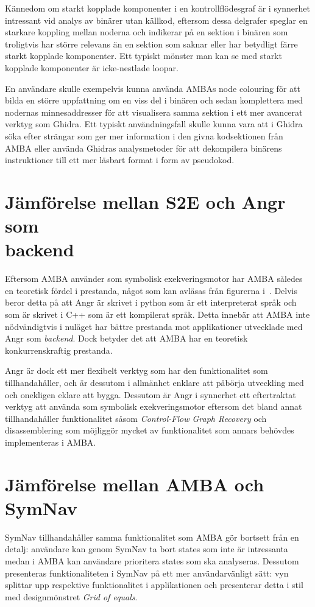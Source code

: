 Kännedom om starkt kopplade komponenter i en kontrollflödesgraf är i synnerhet
intressant vid analys av binärer utan källkod, eftersom dessa delgrafer speglar
en starkare koppling mellan noderna och indikerar på en sektion i binären som
troligtvis har större relevans än en sektion som saknar eller har betydligt
färre starkt kopplade komponenter. Ett typiskt mönster man kan se med starkt
kopplade komponenter är icke-nestlade loopar.

En användare skulle exempelvis kunna använda AMBAs node colouring för att bilda
en större uppfattning om en viss del i binären och sedan komplettera med
nodernas minnesaddresser för att visualisera samma sektion i ett mer avancerat
verktyg som Ghidra. Ett typiskt användningsfall skulle kunna vara att i Ghidra
söka efter strängar som ger mer information i den givna kodsektionen från AMBA
eller använda Ghidras analysmetoder för att dekompilera binärens instruktioner
till ett mer läsbart format i form av pseudokod.

\section{Jämförelse mellan S2E och Angr som \\ backend} Eftersom AMBA använder
\stoe{} som symbolisk exekveringsmotor har AMBA således en teoretisk fördel i
prestanda, något som kan avläsas från figurerna
i~\cite[Figur~1-5]{systematic_comparison_symbex}. Delvis beror detta på att Angr
är skrivet i python som är ett interpreterat språk och \stoe{} som är skrivet i
C++ som är ett kompilerat språk. Detta innebär att AMBA inte nödvändigtvis i
nuläget har bättre prestanda mot applikationer utvecklade med Angr som
\emph{backend}. Dock betyder det att AMBA har en teoretisk konkurrenskraftig
prestanda.

Angr är dock ett mer flexibelt verktyg som har den funktionalitet som \stoe{}
tillhandahåller, och är dessutom i allmänhet enklare att påbörja utveckling med
och onekligen eklare att bygga. Dessutom är Angr i synnerhet ett eftertraktat
verktyg att använda som symbolisk exekveringsmotor eftersom det bland annat
tillhandahåller funktionalitet såsom \emph{Control-Flow Graph Recovery} och
disassemblering som möjliggör mycket av funktionalitet som annars behövdes
implementeras i AMBA.

\section{Jämförelse mellan AMBA och SymNav} SymNav tillhandahåller samma
funktionalitet som AMBA gör bortsett från en detalj: användare kan genom SymNav
ta bort states som inte är intressanta medan i AMBA kan användare prioritera
states som ska analyseras. Dessutom presenteras funktionaliteten i SymNav på ett
mer användarvänligt sätt: vyn splittar upp respektive funktionalitet i
applikationen och presenterar detta i stil med designmönstret \emph{Grid of
    equals}.

